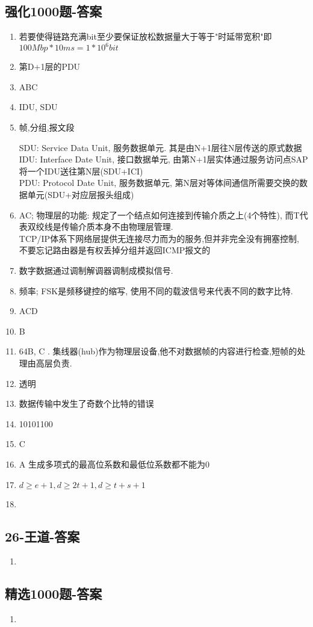 \documentclass[12pt, a4paper, oneside, UTF8]{ctexbook}
\begin{document}
\subsection{强化1000题-答案}
\begin{enumerate}
    \item 若要使得链路充满bit至少要保证放松数据量大于等于"时延带宽积"即$100Mbp*10ms = 1 * 10^6 bit$
    \item 第D+1层的PDU
    \item ABC 
    \item IDU, SDU 
    \item 帧,分组,报文段
    \begin{remark}
        SDU: Service Data Unit, 服务数据单元. 其是由N+1层往N层传送的原式数据 \\
        IDU: Interface Date Unit, 接口数据单元, 由第N+1层实体通过服务访问点SAP将一个IDU送往第N层(SDU+ICI) \\
        PDU: Protocol Date Unit, 服务数据单元, 第N层对等体间通信所需要交换的数据单元(SDU+对应层报头组成) 
    \end{remark}
    \item AC; 物理层的功能: 规定了一个结点如何连接到传输介质之上(4个特性), 而T代表双绞线是传输介质本身不由物理层管理.\\
    TCP/IP体系下网络层提供无连接尽力而为的服务,但并非完全没有拥塞控制, 不要忘记路由器是有权丢掉分组并返回ICMP报文的
    \item {\color{red} 数字数据}通过调制解调器调制成模拟信号.
    \item 频率; FSK是频移键控的缩写, 使用不同的载波信号来代表不同的数字比特.
    \item ACD 
    \item B 
    \item 64B, C . 集线器(hub)作为物理层设备,他不对数据帧的内容进行检查,短帧的处理由高层负责. 
    \item 透明
    \item 数据传输中发生了奇数个比特的错误
    \item 10101100
    \item C 
    \item A 生成多项式的最高位系数和最低位系数都不能为0
    \item $d\geq e+1, d\geq 2t+1, d\geq t + s + 1$
    \item 
\end{enumerate}

\subsection{26-王道-答案}
\begin{enumerate}
    \item 
\end{enumerate}
\subsection{精选1000题-答案}
\begin{enumerate}
    \item 
\end{enumerate}
\ifx\allfiles\undefined
\end{document}
